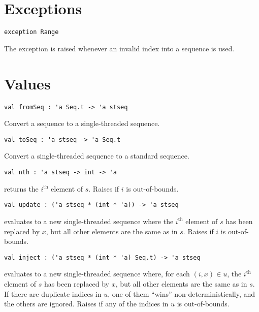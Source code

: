 \section{Exceptions}

\begin{gram}
\begin{verbatim}
exception Range
\end{verbatim}
The  exception is raised whenever an invalid index into a sequence
is used.
\end{gram}


\section{Values}

\begin{gram}[fromSeq]
\label{gr:st-seq-interface:fromSeq}
\begin{verbatim}
val fromSeq : 'a Seq.t -> 'a stseq
\end{verbatim}
Convert a sequence to a single-threaded sequence.
\end{gram}

\begin{gram}[toSeq]
\label{gr:st-seq-interface:toSeq}
\begin{verbatim}
val toSeq : 'a stseq -> 'a Seq.t
\end{verbatim}
Convert a single-threaded sequence to a standard sequence.
\end{gram}

\begin{gram}[nth]
\label{gr:st-seq-interface:nth}
\begin{verbatim}
val nth : 'a stseq -> int -> 'a
\end{verbatim}
 returns the $i^\text{th}$ element of $s$. Raises 
if $i$ is out-of-bounds.
\end{gram}

\begin{gram}[update]
\label{gr:st-seq-interface:update}
\begin{verbatim}
val update : ('a stseq * (int * 'a)) -> 'a stseq
\end{verbatim}
 evaluates to a new single-threaded sequence where
the $i^\text{th}$ element of $s$ has been replaced by $x$, but all other
elements are the same as in $s$. Raises  if $i$ is out-of-bounds.
\end{gram}

\begin{gram}[inject]
\label{gr:st-seq-interface:inject}
\begin{verbatim}
val inject : ('a stseq * (int * 'a) Seq.t) -> 'a stseq
\end{verbatim}
 evaluates to a new single-threaded sequence where, for
each $(i,x) \in u$, the $i^\text{th}$ element of $s$ has been replaced by $x$,
but all other elements are the same as in $s$. If there are duplicate indices
in $u$, one of them ``wins'' non-deterministically, and the others are ignored.
Raises  if any of the indices in $u$ is out-of-bounds.
\end{gram}

